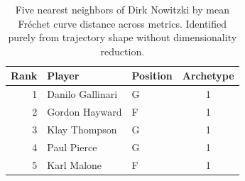 \begin{table}[htbp]
  \centering\small
  \begin{tabular}{rllc}
    \toprule
    Rank & Player & Position & Archetype \\
    \midrule
    1 & Danilo Gallinari & G & 1 \\
    2 & Gordon Hayward & F & 1 \\
    3 & Klay Thompson & G & 1 \\
    4 & Paul Pierce & G & 1 \\
    5 & Karl Malone & F & 1 \\
    \bottomrule
  \end{tabular}
  \caption{Five nearest neighbors of Dirk Nowitzki by mean Fr\'{e}chet curve distance across metrics. Identified purely from trajectory shape without dimensionality reduction.}
  \label{tab:Dirk_Nowitzki_frechet_curve_neighbors}
\end{table}

